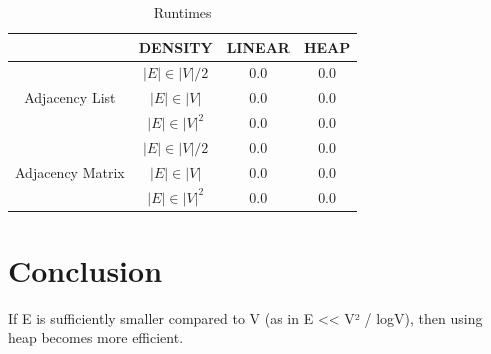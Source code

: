 \documentclass[technote]{IEEEtran}
\begin{document}
\begin{table}[!ht]
    \caption{Runtimes}
    \centering
    \begin{tabular}{|c|c|c|c|}
        \hline
        & DENSITY & LINEAR & HEAP \\ \hline
        \multirow{3}{*}{Adjacency List} 
        & $|E| \in |V|/2$ & 0.0 & 0.0 \\ [0.5ex]\cline{2-4}
        & $|E| \in |V|$ & 0.0 & 0.0 \\ \cline{2-4}
        & $|E| \in |V|^2$ & 0.0 & 0.0 \\ \hline
        \multirow{3}{*}{Adjacency Matrix}
        & $|E| \in |V|/2$ & 0.0 & 0.0 \\ \cline{2-4}
        & $|E| \in |V|$ & 0.0 & 0.0 \\ \cline{2-4}
        & $|E| \in |V|^2$ & 0.0 & 0.0 \\ \hline
    \end{tabular}
\end{table}







\section{Conclusion}
If  E is sufficiently smaller compared to V (as in E << V² / logV), then using heap becomes more efficient.

\lipsum[1-2]

\nocite{*}


\end{document}
